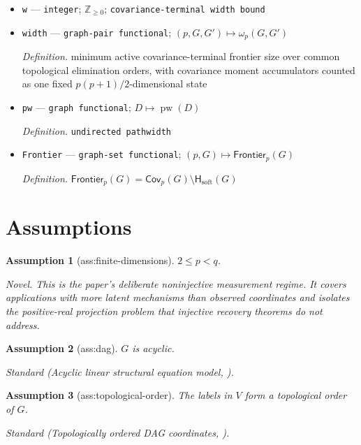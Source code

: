 \documentclass{article}
\newtheorem{assumption}{Assumption}
\begin{document}
\begin{itemize}
  \item \texttt{w} --- \texttt{integer}; \(\mathbb Z_{\ge0}\); \texttt{covariance-\allowbreak{}terminal width bound}
  \item \texttt{width} --- \texttt{graph-\allowbreak{}pair functional}; \((p,G,G')\mapsto\omega_p(G,G')\)
  \par\smallskip\noindent\emph{Definition.} minimum active covariance-terminal frontier size over common topological elimination orders, with covariance moment accumulators counted as one fixed \(p(p+1)/2\)-dimensional state
  \item \texttt{pw} --- \texttt{graph functional}; \(D\mapsto\operatorname{pw}(D)\)
  \par\smallskip\noindent\emph{Definition.} \texttt{undirected pathwidth}
  \item \texttt{Frontier} --- \texttt{graph-\allowbreak{}set functional}; \((p,G)\mapsto\mathsf{Frontier}_p(G)\)
  \par\smallskip\noindent\emph{Definition.} \(\mathsf{Frontier}_p(G)=\mathsf{Cov}_p(G)\setminus\mathsf H_{\mathrm{soft}}(G)\)
\end{itemize}

\section{Assumptions}

\begin{assumption}[ass:finite-dimensions]\label{ass:finite-dimensions}
\(2\le p<q\).
\par\smallskip\noindent\emph{Novel.} This is the paper's deliberate noninjective measurement regime. It covers applications with more latent mechanisms than observed coordinates and isolates the positive-real projection problem that injective recovery theorems do not address.
\end{assumption}

\begin{assumption}[ass:dag]\label{ass:dag}
\(G\) is acyclic.
\par\smallskip\noindent\emph{Standard} (Acyclic linear structural equation model, \cite{LeyesCarrenoMeroniSeigal2025}).
\end{assumption}

\begin{assumption}[ass:topological-order]\label{ass:topological-order}
The labels in \(V\) form a topological order of \(G\).
\par\smallskip\noindent\emph{Standard} (Topologically ordered DAG coordinates, \cite{SquiresSeigalBhateUhler2023}).
\end{assumption}
\end{document}
